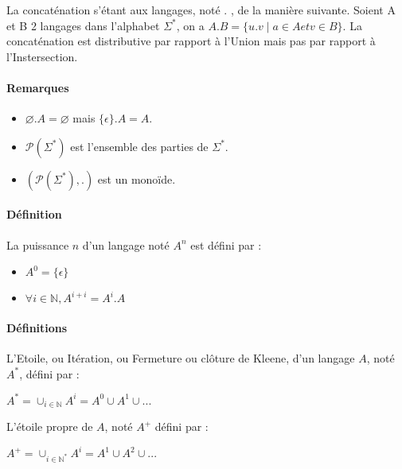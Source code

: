 La concaténation s'étant aux langages, noté . , de la manière suivante. Soient A et B 2 langages dans l'alphabet $\Sigma^*$, on a $A.B=\{u.v \mid a \in A et v \in B\}$. La concaténation est distributive par rapport à l'Union mais pas par rapport à l'Instersection. 



\paragraph{Remarques} %
\label{par:remarques}

\begin{itemize}
	\item $\varnothing.A=\varnothing$ mais $\{\epsilon\}.A=A$.
	\item $\mathcal{P}(\Sigma^*)$ est l'ensemble des parties de $\Sigma^*$.
	\item $(\mathcal{P}(\Sigma^*),.)$ est un monoïde.
\end{itemize}



\paragraph{Définition} %
\label{par:d_finition}

La puissance $n$ d'un langage noté $A^n$ est défini par :
\begin{itemize}
	\item $A^0=\{\epsilon\}$
	\item $\forall i \in \mathbb{N}, A^{i+i}=A^i.A$
\end{itemize}



\paragraph{Définitions} %
\label{par:d_finitions}

L'Etoile, ou Itération, ou Fermeture ou clôture de Kleene, d'un langage $A$, noté $A^*$, défini par :

$A^* = \cup_{i \in \mathbb{N}} A^i = A^0 \cup A^1 \cup ...$

L'étoile propre de $A$, noté $A^+$ défini par :

$A^+ = \cup_{i\in \mathbb{N^*}} A^i = A^1 \cup A^2 \cup ...$



